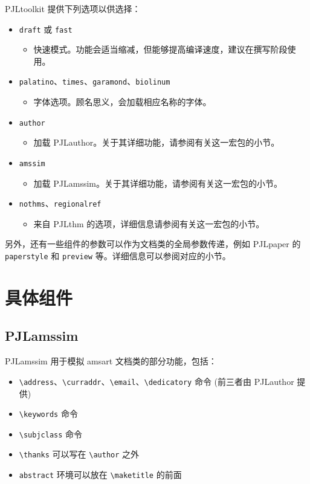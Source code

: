 \documentclass[allowbf]{lebhart}
\providecommand{\PJLtoolkit}{\textsf{PJLtoolkit}}
\providecommand{\PJLamssim}{\textsf{PJLamssim}}
\providecommand{\PJLauthor}{\textsf{PJLauthor}}
\providecommand{\PJLpaper}{\textsf{PJLpaper}}
\providecommand{\PJLthm}{\textsf{PJLthm}}
\begin{document}
\PJLtoolkit{} 提供下列选项以供选择：
\begin{itemize}
    \item \texttt{draft} 或 \texttt{fast}
        \begin{itemize}
            \item 快速模式。功能会适当缩减，但能够提高编译速度，建议在撰写阶段使用。
        \end{itemize}
    \item \texttt{palatino}、\texttt{times}、\texttt{garamond}、\texttt{biolinum}
        \begin{itemize}
            \item 字体选项。顾名思义，会加载相应名称的字体。
        \end{itemize}
    \item \texttt{author}
        \begin{itemize}
            \item 加载 \PJLauthor{}。关于其详细功能，请参阅有关这一宏包的小节。
        \end{itemize}
    \item \texttt{amssim}
        \begin{itemize}
            \item 加载 \PJLamssim{}。关于其详细功能，请参阅有关这一宏包的小节。
        \end{itemize}
    \item \texttt{nothms}、\texttt{regionalref}
        \begin{itemize}
            \item 来自 \PJLthm{} 的选项，详细信息请参阅有关这一宏包的小节。
        \end{itemize}
\end{itemize}
另外，还有一些组件的参数可以作为文档类的全局参数传递，例如 \PJLpaper{} 的 \texttt{paperstyle} 和 \texttt{preview} 等。详细信息可以参阅对应的小节。

\section{具体组件}

\subsection{PJLamssim}

\PJLamssim{} 用于模拟 \textsf{amsart} 文档类的部分功能，包括：
\begin{itemize}
    \item \lstinline|\address|、\lstinline|\curraddr|、\lstinline|\email|、\lstinline|\dedicatory| 命令 (前三者由 \PJLauthor{} 提供)
    \item \lstinline|\keywords| 命令
    \item \lstinline|\subjclass| 命令
    \item \lstinline|\thanks| 可以写在 \lstinline|\author| 之外
    \item \lstinline|abstract| 环境可以放在 \lstinline|\maketitle| 的前面
\end{itemize}
\end{document}

